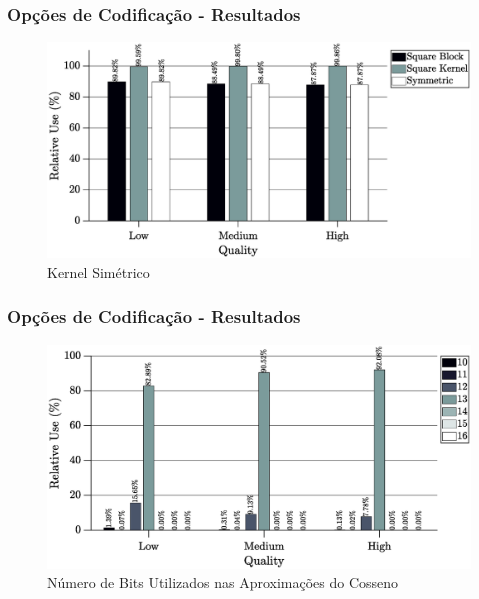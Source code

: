 \documentclass{beamer}
\begin{document}
\begin{frame}
       \frametitle{Opções de Codificação - Resultados}              
       \begin{center}
                     \begin{figure}[h]
                            \centering
                            \includegraphics[width=\textwidth]{Figures/squareAvg.eps}
                            \caption{Kernel Simétrico}
                     \end{figure}
       \end{center}
\end{frame}

\begin{frame}
       \frametitle{Opções de Codificação - Resultados}              
       \begin{center}
                     \begin{figure}[h]
                            \centering
                            \includegraphics[width=\textwidth]{Figures/cosBitAvg.eps}
                            \caption{Número de Bits Utilizados nas Aproximações do Cosseno}
                     \end{figure}
       \end{center}
\end{frame}
\end{document}
